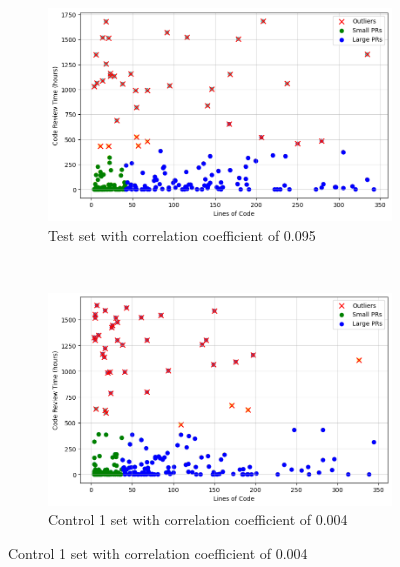 \begin{figure}[htbp]
    \centering
    \begin{subfigure}[t]{\columnwidth}
        \centering
        \includegraphics[scale=0.35]{Figures/test_dist.png}
        \caption{Test set with correlation coefficient of 0.095}
    \end{subfigure}%
    ~ 
    \begin{subfigure}[t]{\columnwidth}
        \centering
        \includegraphics[scale=0.35]{Figures/control1_dist.png}
        \caption{Control 1 set with correlation coefficient of 0.004}
    \end{subfigure}


\end{figure}
